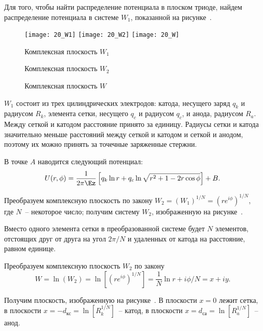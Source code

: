 
Для того, чтобы найти распределение потенциала в плоском триоде, найдем
распределение потенциала в системе \( W_1 \), показанной на рисунке~.

\begin{figure}[h!]
  \center
  \texttt{[image: 20\_W1]} \hspace{1em}
  \texttt{[image: 20\_W2]} \hspace{1em}
  \texttt{[image: 20\_W]} \\
  \parbox{.3\textwidth}{\caption{Комплексная плоскость \( W_1 \)}
    \label{pic20W1}} \hspace{1em}
  \parbox{.3\textwidth}{\caption{Комплексная плоскость \( W_2 \)}
    \label{pic20W2}} \hspace{1em}
  \parbox{.3\textwidth}{\caption{Комплексная плоскость \( W \)}
    \label{pic20W}}
\end{figure}

\( W_1 \) состоит из трех цилиндрических электродов: катода, несущего заряд
\( q_k \) и радиусом \( R_k \), элемента сетки, несущего \( q_c \) и радиусом
\( q_c \), и анода, радиусом \( R_a \). Между сеткой и катодом расстояние
принято за единицу. Радиусы сетки и катода значительно меньше расстояний между
сеткой и катодом и сеткой и анодом, поэтому их можно принять за точечные
заряженные стержни.

В точке \( A \) наводится следующий потенциал:
\begin{equation}
  U(r, \phi) = \frac{1}{2\pi\Ez}\left[ q_k\ln r + q_c\ln\sqrt{r^2 + 1 -
    2r\cos\phi} \right] + B.
  \label{eq20U1}
\end{equation}

Преобразуем комплексную плоскость по закону
\( W_2 = (W_1)^{1 / N} = (re^{i\phi})^{1 / N} \), где \( N \)~-- некоторое
число; получим систему \( W_2 \), изображенную на рисунке~.

Вместо одного элемента сетки в преобразованной системе будет \( N \) элементов,
отстоящих друг от друга на угол \( 2\pi / N \) и удаленных от катода на
расстояние, равном единице.

Преобразуем комплексную плоскость \( W_2 \) по закону
\[
  W = \ln(W_2) = \ln\left[ (re^{i\phi})^{1 / N} \right] = \frac{1}{N}\ln r +
    i\phi / N = x + iy.
\]

Получим плоскость, изображенную на рисунке~. В плоскости \( x = 0 \)
лежит сетка, в плоскости \( x = -d_\text{кс} = \ln\left[ R_k^{1 / N}
\right] \)~-- катод, в плоскости \( x = d_\text{са} =
\ln\left[ R_a^{1 / N} \right] \)~-- анод.

